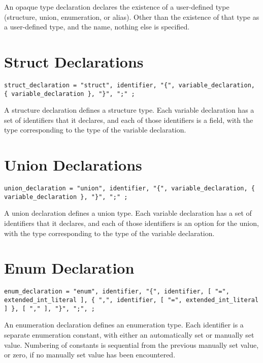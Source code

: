 \documentclass[letterpaper,12pt]{book}
\begin{document}
An opaque type declaration declares the existence of a user-defined type (structure, union, enumeration, or alias). Other than the existence of that type as a user-defined type, and the name, nothing else is specified.

\section{Struct Declarations}

\begin{lstlisting}[breaklines=true]
struct_declaration = "struct", identifier, "{", variable_declaration, { variable_declaration }, "}", ";" ;
\end{lstlisting}

A structure declaration defines a structure type. Each variable declaration has a set of identifiers that it declares, and each of those identifiers is a field, with the type corresponding to the type of the variable declaration.

\section{Union Declarations}

\begin{lstlisting}[breaklines=true]
union_declaration = "union", identifier, "{", variable_declaration, { variable_declaration }, "}", ";" ;
\end{lstlisting}

A union declaration defines a union type. Each variable declaration has a set of identifiers that it declares, and each of those identifiers is an option for the union, with the type corresponding to the type of the variable declaration.

\section{Enum Declaration}

\begin{lstlisting}[breaklines=true]
enum_declaration = "enum", identifier, "{", identifier, [ "=", extended_int_literal ], { ",", identifier, [ "=", extended_int_literal ] }, [ "," ], "}", ";", ;
\end{lstlisting}

An enumeration declaration defines an enumeration type. Each identifier is a separate enumeration constant, with either an automatically set or manually set value. Numbering of constants is sequential from the previous manually set value, or zero, if no manually set value has been encountered.
\end{document}
